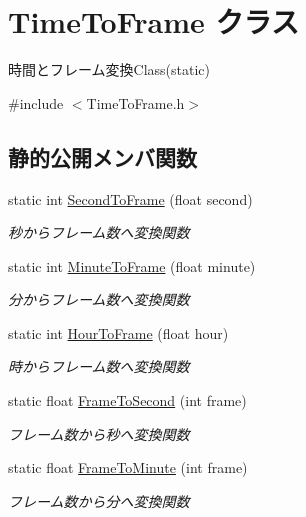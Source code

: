 \hypertarget{class_time_to_frame}{}\section{Time\+To\+Frame クラス}
\label{class_time_to_frame}


時間とフレーム変換\+Class(static)  




{\ttfamily \#include $<$Time\+To\+Frame.\+h$>$}

\subsection*{静的公開メンバ関数}
\begin{DoxyCompactItemize}
\item 
static int \mbox{\hyperlink{class_time_to_frame_a02fe55cc63bdffd73d092d30cc7f0153}{Second\+To\+Frame}} (float second)
\begin{DoxyCompactList}\small\item\em 秒からフレーム数へ変換関数 \end{DoxyCompactList}\item 
static int \mbox{\hyperlink{class_time_to_frame_acbf546584774a378e03270592f0500e8}{Minute\+To\+Frame}} (float minute)
\begin{DoxyCompactList}\small\item\em 分からフレーム数へ変換関数 \end{DoxyCompactList}\item 
static int \mbox{\hyperlink{class_time_to_frame_ab2e0cac54c1c7bcab824c27f8d30f3f4}{Hour\+To\+Frame}} (float hour)
\begin{DoxyCompactList}\small\item\em 時からフレーム数へ変換関数 \end{DoxyCompactList}\item 
static float \mbox{\hyperlink{class_time_to_frame_a3d24db23e04cc41af8106883b4598b00}{Frame\+To\+Second}} (int frame)
\begin{DoxyCompactList}\small\item\em フレーム数から秒へ変換関数 \end{DoxyCompactList}\item 
static float \mbox{\hyperlink{class_time_to_frame_a1ec1bf2a0e8ad53782b2ad0bce8b7c78}{Frame\+To\+Minute}} (int frame)
\begin{DoxyCompactList}\small\item\em フレーム数から分へ変換関数 \end{DoxyCompactList}\item 

\end{DoxyCompactItemize}
